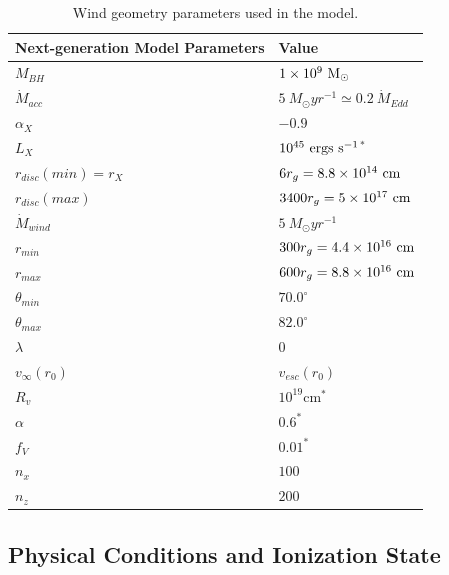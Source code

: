 \documentclass[useAMS,usenatbib]{mn2e_x}
\begin{document}
\begin{table}
\begin{tabular}{p{3cm}p{4cm}}
\hline Next-generation Model Parameters 	&	 Value \\ 
\hline \hline 
$M_{BH}$ 	 &	 $1\times 10^9~\rm{M_{\odot}}$ \\ 
$\dot{M}_{acc}$ 	 &	 $5~M_{\odot}yr^{-1} \simeq 0.2~\dot{M}_{Edd}$\\ 
$\alpha_X$ 	 &	 $-0.9$ \\ 
$L_{X} $ 	 &	 $10^{45}~\rm{ergs~s^{-1}}$$^*$ \\ 
$r_{disc}(min)=r_{X}$   &	 $6r_g=8.8\times10^{14}~{\rm cm}$ \\ 
$r_{disc}(max)$   &	 $3400r_g = 5\times10^{17}~{\rm cm}$ \\ 
$\dot{M}_{wind}$  &	 $5~M_{\odot}yr^{-1}$ \\ 
$r_{min}$ 	&	 $300r_{g} = 4.4\times10^{16}~{\rm cm}$\\ 
$r_{max}$ 	&	 $600r_{g} = 8.8\times10^{16}~{\rm cm}$ \\ 
$\theta_{min}$ 	&	 $70.0^{\circ}$ \\ 
$\theta_{max}$ 	&	 $82.0^{\circ}$ \\ 
$\lambda$ 	&	 $0$ \\ 
$v_{\infty}(r_0)$ 	&	 $v_{esc}(r_0)$ \\ 
$R_v$  	        &	 $10^{19}$cm$^*$ \\ 
$\alpha$ 	&	 $0.6^*$ \\
$f_V$ 	&	 $0.01^*$  \\
$n_x$ 	&	 $100$  \\
$n_z$ 	&	 $200$  \\
\hline 
\end{tabular}
\caption{Wind geometry parameters used in the model.}
\label{wind_param}
\end{table}



\subsection{Physical Conditions and Ionization State}
\end{document}
